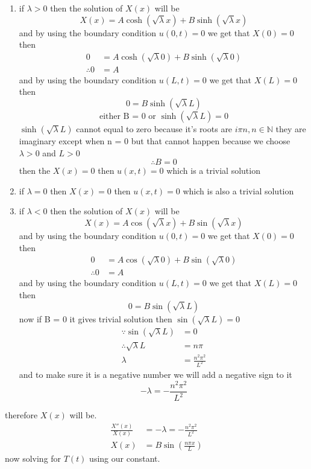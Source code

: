 \documentclass[]{article}
\begin{document}
\begin{enumerate}
\item if $\lambda > 0$ then the solution of $X(x)$ will be 
\[
X(x) = A \cosh(\sqrt{\lambda} x) + B \sinh(\sqrt{\lambda}x)
\]
and by using the boundary condition $u(0,t) = 0$ we get that $X(0) = 0$ then
\begin{align*}
    0 &= A \cosh(\sqrt{\lambda} 0) + B \sinh(\sqrt{\lambda}0)\\
    \therefore 0 &= A
\end{align*}
and by using the boundary condition $u(L,t) = 0$ we get that $X(L) = 0$ then
\[
    0 = B \sinh(\sqrt{\lambda}L)    
\]
\[
    \text{either B = 0 or } \sinh(\sqrt{\lambda}L) = 0    
\]    
$\sinh(\sqrt{\lambda}L)$ cannot equal to zero because it's roots are $i \pi n , n \in \mathbb{N}$ 
they are imaginary except when n = 0 but that cannot happen because we choose $\lambda > 0$ and $L > 0$
\[
    \therefore B = 0
\]
then the $X(x) = 0$ then $u(x,t) = 0 $ which is a trivial solution
\item if $\lambda = 0$ then $X(x) = 0 $ then $u(x,t) = 0 $ which is also a trivial solution
\item if $\lambda < 0$ then the solution of $X(x)$ will be 
\[
X(x) = A \cos(\sqrt{\lambda} x) + B \sin(\sqrt{\lambda}x)
\]
and by using the boundary condition $u(0,t) = 0$ we get that $X(0) = 0$ then
\begin{align*}
    0 &= A \cos(\sqrt{\lambda} 0) + B \sin(\sqrt{\lambda}0)\\
    \therefore 0 &= A
\end{align*} 
and by using the boundary condition $u(L,t) = 0$ we get that $X(L) = 0$ then
\[
    0 = B \sin  (\sqrt{\lambda}L)    
\]
now if B = 0 it gives trivial solution then $\sin(\sqrt{\lambda}L) = 0$ 
\begin{align*}
    \because \sin(\sqrt{\lambda}L) &= 0 \\
    \therefore \sqrt{\lambda} L &= n \pi \\
    \lambda &= \frac{n^2 \pi^2}{L^2}
\end{align*}
and to make sure it is a negative number we will add a negative sign to it
\[
    -\lambda = -\frac{n^2 \pi^2}{L^2}
\]
\end{enumerate}
therefore $X(x)$ will be.
\begin{align*}
\frac{X''(x)}{X(x)} &= -\lambda = -\frac{n^2 \pi^2}{L^2}
\\
X(x) &= B \sin\left(\frac{n\pi x}{L}\right)
\end{align*}
now solving for $T(t)$ using our constant.
\end{document}
